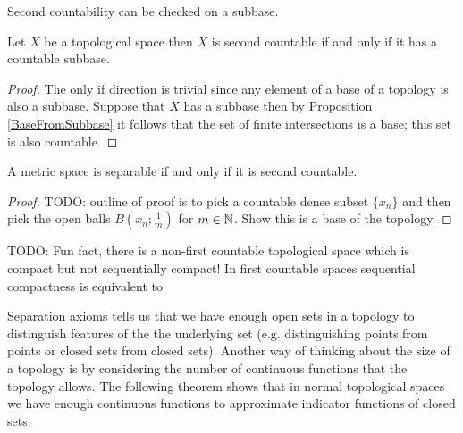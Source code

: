 Second countability can be checked on a subbase.
\begin{prop}\label{SecondCountabilityViaSubbase}Let $X$ be a topological space then $X$ is second countable if and only if it has a countable subbase.
\end{prop}
\begin{proof}
The only if direction is trivial since any element of a base of a topology is also a subbase. Suppose that $X$ has a subbase then by Proposition \ref{BaseFromSubbase} it follows that the set of finite intersections is a base; this set is also countable.
\end{proof}

\begin{lem}\label{SeparabilitySecondCountabilityMetricSpaces}A metric space is separable if and only if it is second countable.
\end{lem}
\begin{proof}
TODO:
outline of proof is to pick a countable dense subset $\lbrace x_n
\rbrace$ and then pick the open balls $B(x_n; \frac{1}{m})$ for $m \in
\mathbb{N}$.  Show this is a base of the topology.
\end{proof}

TODO:  Fun fact, there is a non-first countable topological space
which is compact but not sequentially compact!  In first countable
spaces sequential compactness is equivalent to 

Separation axioms tells us that we have enough open sets in a topology
to distinguish features of the the underlying set (e.g. distinguishing
points from points or closed sets from closed sets).  Another way of
thinking about the size of a topology is by considering the number of
continuous functions that the topology allows.  The following theorem
shows that in normal topological spaces we have enough continuous
functions to approximate indicator functions of closed sets.

